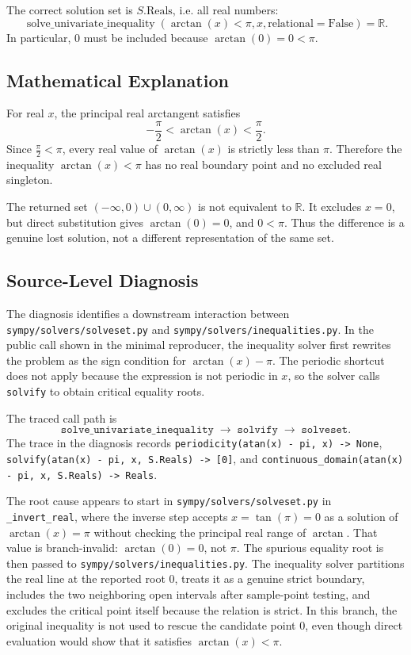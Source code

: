 \documentclass[11pt]{article}
\begin{document}
The correct solution set is \(S.\mathrm{Reals}\), i.e. all real numbers:
\[
  \operatorname{solve\_univariate\_inequality}(\arctan(x)<\pi,x,
  \mathrm{relational}=\mathrm{False}) = \mathbb{R}.
\]
In particular, \(0\) must be included because \(\arctan(0)=0<\pi\).

\subsection{Mathematical Explanation}

For real \(x\), the principal real arctangent satisfies
\[
  -\frac{\pi}{2} < \arctan(x) < \frac{\pi}{2}.
\]
Since \(\frac{\pi}{2}<\pi\), every real value of \(\arctan(x)\) is strictly
less than \(\pi\).  Therefore the inequality \(\arctan(x)<\pi\) has no real
boundary point and no excluded real singleton.

The returned set \((-\infty,0)\cup(0,\infty)\) is not equivalent to
\(\mathbb{R}\).  It excludes \(x=0\), but direct substitution gives
\(\arctan(0)=0\), and \(0<\pi\).  Thus the difference is a genuine lost
solution, not a different representation of the same set.

\subsection{Source-Level Diagnosis}

\begin{sloppypar}
The diagnosis identifies a downstream interaction between
\nolinkurl{sympy/solvers/solveset.py} and
\nolinkurl{sympy/solvers/inequalities.py}.  In the public call shown in the
minimal reproducer, the inequality solver first rewrites the problem as the
sign condition for \(\arctan(x)-\pi\).  The periodic shortcut does not apply because the
expression is not periodic in \(x\), so the solver calls \texttt{solvify} to
obtain critical equality roots.
\end{sloppypar}

The traced call path is
\[
\texttt{solve\_univariate\_inequality}
  \;\longrightarrow\; \texttt{solvify}
  \;\longrightarrow\; \texttt{solveset}.
\]
The trace in the diagnosis records
\texttt{periodicity(atan(x) - pi, x) -> None},
\texttt{solvify(atan(x) - pi, x, S.Reals) -> [0]}, and
\texttt{continuous\_domain(atan(x) - pi, x, S.Reals) -> Reals}.

The root cause appears to start in
\nolinkurl{sympy/solvers/solveset.py} in \texttt{\_invert\_real}, where the
inverse step accepts \(x=\tan(\pi)=0\) as a solution of
\(\arctan(x)=\pi\) without checking the principal real range of
\(\arctan\).  That value is branch-invalid: \(\arctan(0)=0\), not \(\pi\).
The spurious equality root is then passed to
\nolinkurl{sympy/solvers/inequalities.py}.  The inequality solver partitions
the real line at the reported root \(0\), treats it as a genuine strict
boundary, includes the two neighboring open intervals after sample-point
testing, and excludes the critical point itself because the relation is
strict.  In this branch, the original inequality is not used to rescue the
candidate point \(0\), even though direct evaluation would show that it
satisfies \(\arctan(x)<\pi\).
\end{document}
